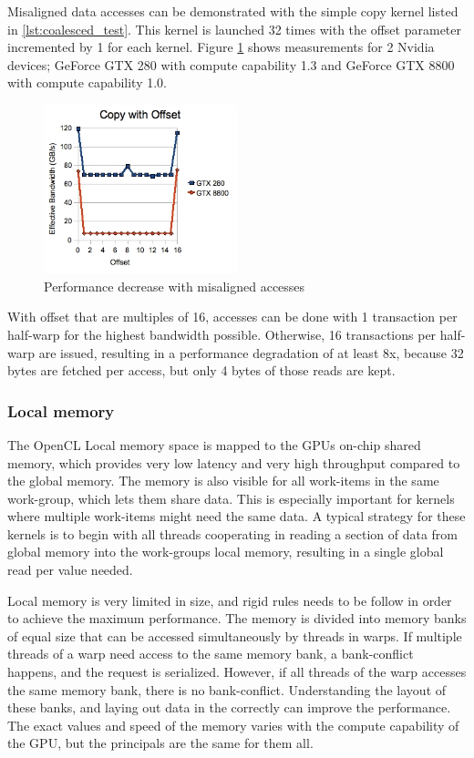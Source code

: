 Misaligned data accesses can be demonstrated with the simple copy
kernel listed in \ref{lst:coalesced_test}. This kernel is launched 32
times with the offset parameter incremented by 1 for each kernel.
Figure \ref{fig:coalesced-performance} shows measurements for 2 Nvidia
devices; GeForce GTX 280 with compute capability 1.3 and GeForce GTX
8800 with compute capability 1.0.

\begin{figure}[h]
  \centering
  \includegraphics[width=0.5\textwidth]{images/coalesced-performance.png}
  \caption{Performance decrease with misaligned accesses}
  \label{fig:coalesced-performance}
\end{figure}

With offset that are multiples of 16, accesses can be done with 1
transaction per half-warp for the highest bandwidth possible.
Otherwise, 16 transactions per half-warp are issued, resulting in a
performance degradation of at least 8x, because 32 bytes are fetched
per access, but only 4 bytes of those reads are kept.

\subsubsection{Local memory}
\label{sect:local-mem-optimization}

The OpenCL Local memory space is mapped to the GPUs on-chip shared
memory, which provides very low latency and very high throughput
compared to the global memory. The memory is also visible for all
work-items in the same work-group, which lets them share data. This is
especially important for kernels where multiple work-items might need
the same data. A typical strategy for these kernels is to begin with
all threads cooperating in reading a section of data from global
memory into the work-groups local memory, resulting in a single global
read per value needed. 


Local memory is very limited in size, and rigid rules needs to be
follow in order to achieve the maximum performance. The memory is
divided into memory banks of equal size that can be accessed
simultaneously by threads in warps. If multiple threads of a warp need
access to the same memory bank, a bank-conflict happens, and the
request is serialized. However, if all threads of the warp accesses
the same memory bank, there is no bank-conflict. Understanding the
layout of these banks, and laying out data in the correctly can
improve the performance. The exact values and speed of the memory
varies with the compute capability of the GPU, but the principals are
the same for them all.

